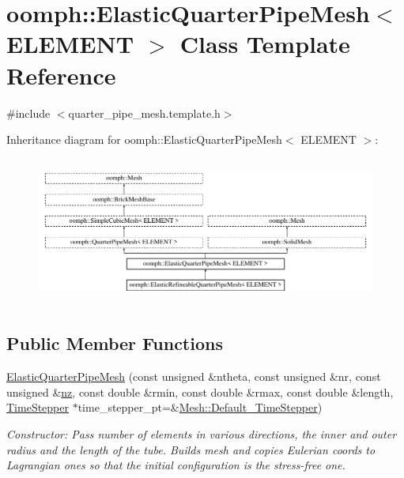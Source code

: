\hypertarget{classoomph_1_1ElasticQuarterPipeMesh}{}\section{oomph\+:\+:Elastic\+Quarter\+Pipe\+Mesh$<$ E\+L\+E\+M\+E\+NT $>$ Class Template Reference}
\label{classoomph_1_1ElasticQuarterPipeMesh}


{\ttfamily \#include $<$quarter\+\_\+pipe\+\_\+mesh.\+template.\+h$>$}

Inheritance diagram for oomph\+:\+:Elastic\+Quarter\+Pipe\+Mesh$<$ E\+L\+E\+M\+E\+NT $>$\+:\begin{figure}[H]
\begin{center}
\leavevmode
\includegraphics[height=4.912281cm]{classoomph_1_1ElasticQuarterPipeMesh}
\end{center}
\end{figure}
\subsection*{Public Member Functions}
\begin{DoxyCompactItemize}
\item 
\hyperlink{classoomph_1_1ElasticQuarterPipeMesh_a4ccb6983820b774bc72b7d469728ca30}{Elastic\+Quarter\+Pipe\+Mesh} (const unsigned \&ntheta, const unsigned \&nr, const unsigned \&\hyperlink{classoomph_1_1SimpleCubicMesh_ad78725440e4e87598fd9339653b28e61}{nz}, const double \&rmin, const double \&rmax, const double \&length, \hyperlink{classoomph_1_1TimeStepper}{Time\+Stepper} $\ast$time\+\_\+stepper\+\_\+pt=\&\hyperlink{classoomph_1_1Mesh_a12243d0fee2b1fcee729ee5a4777ea10}{Mesh\+::\+Default\+\_\+\+Time\+Stepper})
\begin{DoxyCompactList}\small\item\em Constructor\+: Pass number of elements in various directions, the inner and outer radius and the length of the tube. Builds mesh and copies Eulerian coords to Lagrangian ones so that the initial configuration is the stress-\/free one. \end{DoxyCompactList}\end{DoxyCompactItemize}
